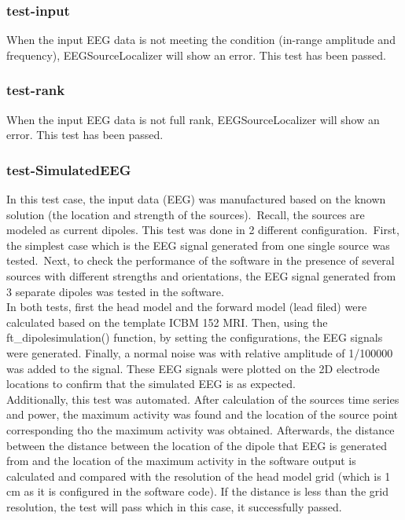 \documentclass[12pt, titlepage]{article}
\renewcommand{\progname}{EEGSourceLocalizer}
\begin{document}
\subsubsection{test-input}
\label{test-input}
When the input EEG data is not meeting the condition (in-range amplitude and frequency), \progname{} will show an error. This test has been passed.

\subsubsection{test-rank}
\label{test-rank}
When the input EEG data is not full rank, \progname{} will show an error. This test has been passed.

\subsubsection{test-SimulatedEEG}
\label{test-SimulatedEEG}

In this test case, the input data (EEG) was manufactured based on the known solution (the location and strength of the sources).\ Recall, the sources are modeled as current dipoles. This test was done in 2 different configuration.\ First, the simplest case which is the EEG signal generated from one single source was tested.\ Next, to check the performance of the software in the presence of several sources with different strengths and orientations, the EEG signal generated from 3 separate dipoles was tested in the software.\\

In both tests, first the head model and the forward model (lead filed) were calculated based on the template ICBM 152 MRI. Then, using the ft\_dipolesimulation() function, by setting the configurations, the EEG signals were generated. Finally, a normal noise was with relative amplitude of 1/100000 was added to the signal. These EEG signals were plotted on the 2D electrode locations to confirm that the simulated EEG is as expected.\\

Additionally, this test was automated. After calculation of the sources time series and power, the maximum activity was found and the location of the source point corresponding tho the maximum activity was obtained. Afterwards, the distance between the distance between the location of the dipole that EEG is generated from and the location of the maximum activity in the software output is calculated and compared with the resolution of the head model grid (which is 1 cm as it is configured in the software code). If the distance is less than the grid resolution, the test will pass which in this case, it successfully passed. 
\end{document}
